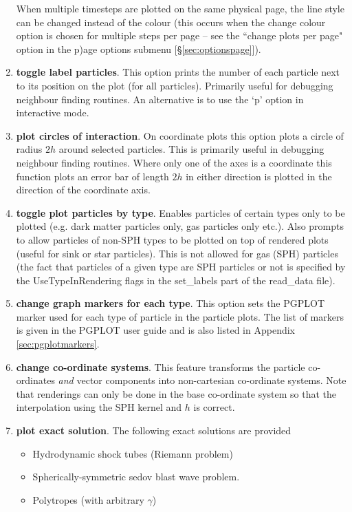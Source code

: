 \documentclass[a4paper,11pt]{article}
\begin{document}
\begin{enumerate}
 When multiple timesteps are plotted on the same physical page, the line style can be
changed instead of the colour (this occurs when the change colour option is chosen for multiple steps per page
-- see the ``change plots per page" option in the p)age options submenu [\S\vref{sec:optionspage}]).
\item \textbf{toggle label particles}. This option prints the number of each particle
next to its position on the plot (for all particles). Primarily useful for debugging neighbour finding
routines. An alternative is to use the `p' option in interactive mode.
\item \textbf{plot circles of interaction}. On coordinate plots this option plots a circle of
radius $2h$ around selected particles. 
This is primarily useful in debugging neighbour finding routines. Where only one of the axes is a 
coordinate this function plots an error bar of length $2h$ in either direction is plotted
in the direction of the coordinate axis.
\item \textbf{toggle plot particles by type}. Enables particles of certain types only to be plotted
(e.g. dark matter particles only, gas particles only etc.). Also prompts to allow particles of non-SPH types to be
plotted on top of rendered plots (useful for sink or star particles). This is not allowed for gas
(SPH) particles (the fact that particles of a given type are SPH particles or not is specified by the UseTypeInRendering
flags in the set\_labels part of the read\_data file).
\item \textbf{change graph markers for each type}. This option sets the PGPLOT marker used for each
type of particle in the particle plots. The list of markers is given in the
PGPLOT user guide and is also listed in Appendix \ref{sec:pgplotmarkers}. 
\item \textbf{change co-ordinate systems}. This feature transforms the particle
co-ordinates \emph{and} vector components into non-cartesian co-ordinate systems. Note that
renderings can only be done in the base co-ordinate system so that the interpolation using the SPH
kernel and $h$ is correct.  
\item \textbf{plot exact solution}. The following exact solutions are provided
\begin{itemize}
\item Hydrodynamic shock tubes (Riemann problem)
\item Spherically-symmetric sedov blast wave problem.
\item Polytropes (with arbitrary $\gamma$)

\end{itemize}
\end{enumerate}
\end{document}
